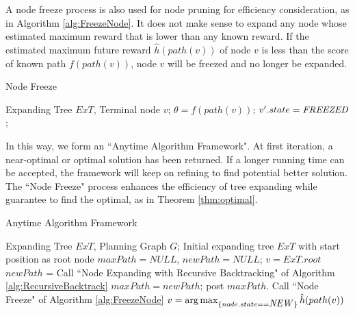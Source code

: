 \documentclass[12pt]{article}
\begin{document}
A node freeze process is also used for node pruning for efficiency consideration, as in Algorithm \ref{alg:FreezeNode}. It does not make sense to expand any node whose estimated maximum reward that is lower than any known reward. If the estimated maximum future reward $ \hat{h}(path(v)) $ of node $ v $ is less than the score of known path $ f(path(v)) $, node $ v $ will be freezed and no longer be expanded.

\begin{algorithm}
\caption{Node Freeze}
\label{alg:FreezeNode}
\begin{algorithmic}
\REQUIRE 
Expanding Tree $ ExT $, Terminal node $ v $;
\STATE $ \theta = f(path(v)) $; 
\STATE $ v'.state = \mbox{\emph{FREEZED}} $; 
\ENDIF
\ENDFOR
\end{algorithmic}
\end{algorithm}

In this way, we form an ``Anytime Algorithm Framework". At first iteration, a near-optimal or optimal solution has been returned. If a longer running time can be accepted, the framework will keep on refining to find potential better solution. The ``Node Freeze" process enhances the efficiency of tree expanding while guarantee to find the optimal, as in Theorem \ref{thm:optimal}.

\begin{algorithm}
\caption{Anytime Algorithm Framework}
\label{alg:Anytime}
\begin{algorithmic}
\REQUIRE 
Expanding Tree $ ExT $, Planning Graph $ G $;
\STATE Initial expanding tree $ ExT $ with start position as root node
\STATE $ maxPath = NULL $, $ newPath = NULL $;
\STATE $ v = ExT.root $
\STATE $ newPath $ = Call ``Node Expanding with Recursive Backtracking" of Algorithm \ref{alg:RecursiveBacktrack}
\STATE $ maxPath = newPath $;
\STATE post $ maxPath $.
\ENDIF
\STATE Call ``Node Freeze" of Algorithm \ref{alg:FreezeNode}
\STATE $ v = \arg \max_{ \{ node.state == \mbox{\emph{NEW}} \} } \hat{h}(path(v)) $
\ENDWHILE 
\end{algorithmic}
\end{algorithm}
\end{document}
